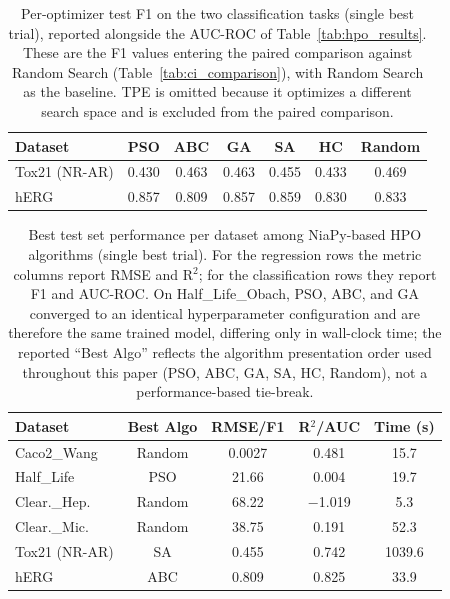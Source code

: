 \documentclass[journal,onecolumn]{IEEEtran}
\begin{document}
\begin{table}[H]
\centering
\caption{Per-optimizer test F1 on the two classification tasks (single best trial), reported alongside the AUC-ROC of Table~\ref{tab:hpo_results}. These are the F1 values entering the paired comparison against Random Search (Table~\ref{tab:ci_comparison}), with Random Search as the baseline. TPE is omitted because it optimizes a different search space and is excluded from the paired comparison.}
\label{tab:hpo_f1}
\small
\setlength{\tabcolsep}{4pt}
\begin{tabular}{lcccccc}
\toprule
\textbf{Dataset} & \textbf{PSO} & \textbf{ABC} & \textbf{GA} & \textbf{SA} & \textbf{HC} & \textbf{Random} \\
\midrule
Tox21 (NR-AR) & 0.430 & 0.463 & 0.463 & 0.455 & 0.433 & 0.469 \\
hERG & 0.857 & 0.809 & 0.857 & 0.859 & 0.830 & 0.833 \\
\bottomrule
\end{tabular}
\end{table}

\begin{table}[H]
\centering
\caption{Best test set performance per dataset among NiaPy-based HPO algorithms (single best trial). For the regression rows the metric columns report RMSE and R$^2$; for the classification rows they report F1 and AUC-ROC. On Half\_Life\_Obach, PSO, ABC, and GA converged to an identical hyperparameter configuration and are therefore the same trained model, differing only in wall-clock time; the reported ``Best Algo'' reflects the algorithm presentation order used throughout this paper (PSO, ABC, GA, SA, HC, Random), not a performance-based tie-break.}
\label{tab:best_results}
\small
\setlength{\tabcolsep}{4pt}
\begin{tabular}{lcccc}
\toprule
\textbf{Dataset} & \textbf{Best Algo} & \textbf{RMSE/F1} & \textbf{R$^2$/AUC} & \textbf{Time (s)} \\
\midrule
Caco2\_Wang & Random & 0.0027 & 0.481 & 15.7 \\
Half\_Life & PSO & 21.66 & 0.004 & 19.7 \\
Clear.\_Hep. & Random & 68.22 & $-$1.019 & 5.3 \\
Clear.\_Mic. & Random & 38.75 & 0.191 & 52.3 \\
Tox21 (NR-AR) & SA & 0.455 & 0.742 & 1039.6 \\
hERG & ABC & 0.809 & 0.825 & 33.9 \\
\bottomrule
\end{tabular}
\end{table}
\end{document}
